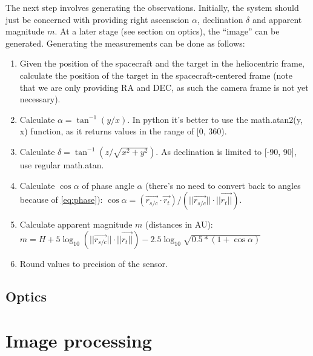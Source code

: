 \documentclass[a4paper,10pt]{article}
\begin{document}
The next step involves generating the observations. Initially, the system should just be concerned with providing right ascenscion $\alpha$, declination $\delta$ and apparent magnitude $m$. At a later stage (see section on optics), the ``image'' can be generated. Generating the measurements can be done as follows:

\begin{enumerate}
 \item Given the position of the spacecraft and the target in the heliocentric frame, calculate the position of the target in the spacecraft-centered frame (note that we are only providing RA and DEC, as such the camera frame is not yet necessary).
 \item Calculate $\alpha = \tan^{-1}(y/x)$. In python it's better to use the math.atan2(y, x) function, as it returns values in the range of [0, 360).
 \item Calculate $\delta = \tan^{-1}(z/\sqrt{x^2 + y^2})$. As declination is limited to [-90, 90], use regular math.atan.
 \item Calculate $\cos \alpha$ of phase angle $\alpha$ (there's no need to convert back to angles because of \autoref{eq:phase}): $\cos \alpha = (\vec{r_{s/c}} \cdot \vec{r_{t}}) / (||\vec{r_{s/c}}|| \cdot ||\vec{r_{t}||})$.
 \item Calculate apparent magnitude $m$ (distances in AU): $m = H + 5 \log _{10} (||\vec{r_{s/c}}|| \cdot ||\vec{r_{t}||}) - 2.5 \log _{10}\sqrt{0.5*(1+\cos \alpha)}$
 \item Round values to precision of the sensor.
\end{enumerate}

\subsection{Optics}



\section{Image processing}
\end{document}

